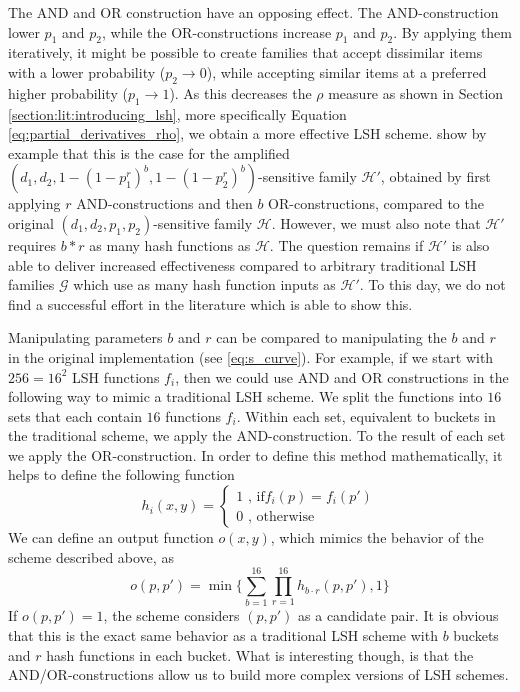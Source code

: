 The AND and OR construction have an opposing effect. The AND-construction lower $p_1$ and $p_2$, while the OR-constructions increase $p_1$ and $p_2$. By applying them iteratively, it might be possible to create families that accept dissimilar items with a lower probability ($p_2 \rightarrow 0$), while accepting similar items at a preferred higher probability ($p_1 \rightarrow 1$). As this decreases the $\rho$ measure as shown in Section \ref{section:lit:introducing_lsh}, more specifically Equation \ref{eq:partial_derivatives_rho}, we obtain a more effective LSH scheme. \cite{LeskovecRU14} show by example that this is the case for the amplified  $(d_1,d_2, 1 -  (1 - p_1^r) ^ b, 1 -  (1 -  p_2^r) ^ b )$-sensitive family $\mathcal{H}'$, obtained by first applying $r$ AND-constructions and then $b$ OR-constructions, compared to the original $(d_1,d_2,p_1,p_2)$-sensitive family $\mathcal{H}$. However, we must also note that $\mathcal{H}'$  requires $b*r$ as many hash functions as $\mathcal{H}$. The question remains if $\mathcal{H}'$ is also able to deliver increased effectiveness compared to arbitrary traditional LSH families $\mathcal{G}$ which use as many hash function inputs as $\mathcal{H}'$. To this day, we do not find a successful effort in the literature which is able to show this. 

Manipulating parameters $b$ and $r$ can be compared to manipulating the $b$ and $r$ in the original implementation (see \ref{eq:s_curve}). For example, if we start with $256 = 16^2$ LSH functions $f_i$, then we could use AND and OR constructions in the following way to mimic a traditional LSH scheme. We split the functions into $16$ sets that each contain $16$ functions $f_i$. Within each set, equivalent to buckets in the traditional scheme, we apply the AND-construction. To the result of each set we apply the OR-construction. In order to define this method mathematically, it helps to define the following function
\begin{equation}
    h_i(x,y) = \begin{cases} 1 \text{          , if} f_i(p) = f_i(p')\\
    0 \text{         , otherwise}
    \end{cases}
\end{equation}
We can define an output function $o(x,y)$, which mimics the behavior of the scheme described above, as
\begin{equation}
    o(p,p') = \min\{\sum_{b=1}^{16}\prod_{r=1}^{16}h_{b \cdot r}(p,p'),1\}
\end{equation}
If $o(p,p') = 1$, the scheme considers $(p,p')$ as a candidate pair. It is obvious that this is the exact same behavior as a traditional LSH scheme with $b$ buckets and $r$ hash functions in each bucket. What is interesting though, is that the AND/OR-constructions allow us to build more complex versions of LSH schemes. 

